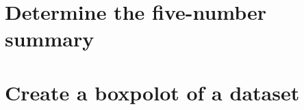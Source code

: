 \documentclass[t]{beamer}
\begin{document}
\section{Determine the five-number summary}

\section{Create a boxpolot of a dataset}
\end{document}
